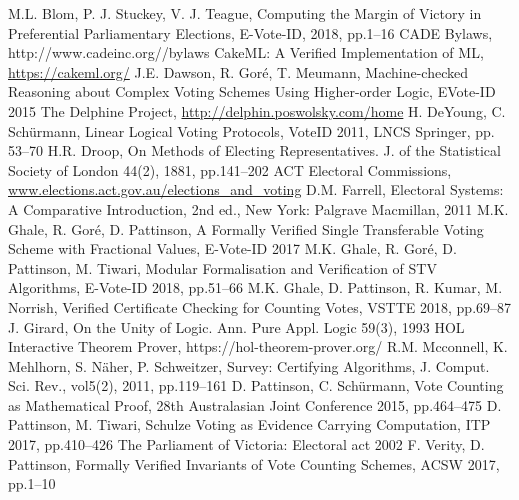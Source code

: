 \documentclass[10pt,conference]{IEEEtran}
\begin{document}

\begin{thebibliography}{00}
M.L. Blom, P. J. Stuckey, V. J. Teague, Computing the Margin of Victory in Preferential Parliamentary Elections, E-Vote-ID, 2018, pp.1--16
CADE Bylaws, http://www.cadeinc.org//bylaws
CakeML: A Verified Implementation of ML, \url{https://cakeml.org/}
J.E. Dawson, R. Gor{\'{e}}, T. Meumann, Machine-checked Reasoning about
  Complex Voting Schemes Using Higher-order Logic, EVote-ID 2015
The Delphine Project, \url{http://delphin.poswolsky.com/home}
H. DeYoung, C. Sch{\"{u}}rmann, Linear Logical Voting Protocols, VoteID 2011, LNCS Springer, pp. 53--70
H.R. Droop, On Methods of Electing Representatives. J. of the Statistical
  Society of London  44(2), 1881, pp.141--202
ACT Electoral Commissions, \url{www.elections.act.gov.au/elections\_and\_voting}
D.M. Farrell, Electoral Systems: A Comparative Introduction, 2nd ed., New York: Palgrave Macmillan, 2011
M.K. Ghale, R. Gor{\'{e}}, D. Pattinson, A Formally Verified Single Transferable Voting Scheme with Fractional Values, E-Vote-ID 2017
M.K. Ghale, R. Gor{\'{e}}, D. Pattinson, M. Tiwari,
 Modular Formalisation and Verification of STV Algorithms, E-Vote-ID 2018, pp.51--66
M.K. Ghale, D. Pattinson, R. Kumar, M. Norrish, Verified Certificate Checking for Counting Votes, VSTTE 2018, pp.69--87
J. Girard, On the Unity of Logic. Ann. Pure Appl. Logic  59(3), 1993
HOL Interactive Theorem Prover, https://hol-theorem-prover.org/
R.M. Mcconnell, K. Mehlhorn, S. N\"{a}her, P. Schweitzer, Survey: Certifying Algorithms, J. Comput. Sci. Rev., vol5(2), 2011, pp.119--161
D. Pattinson, C. Sch{\"{u}}rmann, Vote Counting as Mathematical Proof, 28th Australasian Joint
  Conference 2015, pp.464--475
D. Pattinson, M. Tiwari, Schulze Voting as Evidence Carrying Computation, ITP 2017, pp.410--426
The Parliament of Victoria: Electoral act 2002
F. Verity, D. Pattinson, Formally Verified Invariants of Vote Counting Schemes, ACSW 2017, pp.1--10 
\end{thebibliography}
\end{document}
